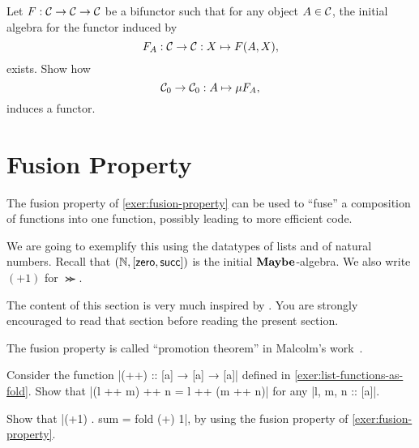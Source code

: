 \begin{exer}\label{exer:initialalg_for_bifunctor_functor} Let $F:\mathcal{C}\to\mathcal{C}\to\mathcal{C}$ be a bifunctor such that for any object $A\in\mathcal{C}$, the initial algebra for the functor induced by 
\[
F_A : \mathcal{C}\to\mathcal{C} : X\mapsto F(A,X),
\]
exists. Show how
\[
{\mathcal{C}}_0 \to {\mathcal{C}}_0 : A\mapsto \mu F_A ,
\]
induces a functor.
\end{exer}



\section{Fusion Property}\label{sec:fusion}

The fusion property of \cref{exer:fusion-property} can be used to ``fuse'' a composition of functions into one function, possibly leading to more efficient code.

We are going to exemplify this using the datatypes of lists and of natural numbers.
Recall that $(\mathbb{N}, [\mathsf{zero},\mathsf{succ}])$ is the initial $\mathbf{Maybe}$-algebra.
We also write $(+1)$ for $\Succ$.

\begin{reading*}
  The content of this section is very much inspired by \cite[\S3.2]{DBLP:journals/jfp/Hutton99}.
  You are strongly encouraged to read that section before reading the present section.

  The fusion property is called ``promotion theorem'' in Malcolm's work~\cite{DBLP:journals/scp/Malcolm90}.
\end{reading*}

\begin{exer}
  Consider the function |(++) :: [a] →  [a] →  [a]| defined in \cref{exer:list-functions-as-fold}.
  Show that |(l ++ m) ++ n = l ++ (m ++ n)| for any |l, m, n :: [a]|.
\end{exer}


\begin{exer}
  Show that |(+1) . sum = fold (+) 1|, by using the fusion property of \cref{exer:fusion-property}.
\end{exer}

